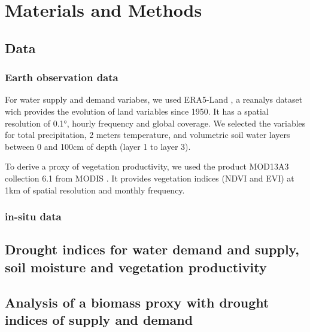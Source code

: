 \documentclass[
  number,
  preprint,
  3p]{elsarticle}
\begin{document}
\hypertarget{materials-and-methods}{%
\section{Materials and Methods}\label{materials-and-methods}}

\hypertarget{data}{%
\subsection{Data}\label{data}}

\hypertarget{earth-observation-data}{%
\subsubsection{Earth observation data}\label{earth-observation-data}}

For water supply and demand variabes, we used ERA5-Land
\citep{Munoz2019}, a reanalys dataset wich provides the evolution of
land variables since 1950. It has a spatial resolution of 0.1°, hourly
frequency and global coverage. We selected the variables for total
precipitation, 2 meters temperature, and volumetric soil water layers
between 0 and 100cm of depth (layer 1 to layer 3).

To derive a proxy of vegetation productivity, we used the product
MOD13A3 collection 6.1 from MODIS \citep{Didan2015}. It provides
vegetation indices (NDVI and EVI) at 1km of spatial resolution and
monthly frequency.

\hypertarget{in-situ-data}{%
\subsubsection{in-situ data}\label{in-situ-data}}

\hypertarget{drought-indices-for-water-demand-and-supply-soil-moisture-and-vegetation-productivity}{%
\subsection{Drought indices for water demand and supply, soil moisture
and vegetation
productivity}\label{drought-indices-for-water-demand-and-supply-soil-moisture-and-vegetation-productivity}}

\hypertarget{analysis-of-a-biomass-proxy-with-drought-indices-of-supply-and-demand}{%
\subsection{Analysis of a biomass proxy with drought indices of supply
and
demand}\label{analysis-of-a-biomass-proxy-with-drought-indices-of-supply-and-demand}}
\end{document}
